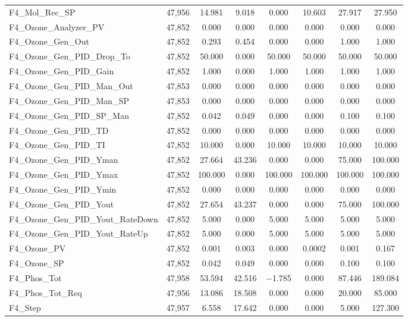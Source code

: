 \begin{table}[!htbp]
{\begin{tabular}{@{\extracolsep{5pt}}lccccccc}
F4\_Mol\_Rec\_SP & 47,956 & 14.981 & 9.018 & 0.000 & 10.603 & 27.917 & 27.950 \\ 
F4\_Ozone\_Analyzer\_PV & 47,852 & 0.000 & 0.000 & 0.000 & 0.000 & 0.000 & 0.000 \\ 
F4\_Ozone\_Gen\_Out & 47,852 & 0.293 & 0.454 & 0.000 & 0.000 & 1.000 & 1.000 \\ 
F4\_Ozone\_Gen\_PID\_Drop\_To & 47,852 & 50.000 & 0.000 & 50.000 & 50.000 & 50.000 & 50.000 \\ 
F4\_Ozone\_Gen\_PID\_Gain & 47,852 & 1.000 & 0.000 & 1.000 & 1.000 & 1.000 & 1.000 \\ 
F4\_Ozone\_Gen\_PID\_Man\_Out & 47,853 & 0.000 & 0.000 & 0.000 & 0.000 & 0.000 & 0.000 \\ 
F4\_Ozone\_Gen\_PID\_Man\_SP & 47,853 & 0.000 & 0.000 & 0.000 & 0.000 & 0.000 & 0.000 \\ 
F4\_Ozone\_Gen\_PID\_SP\_Man & 47,852 & 0.042 & 0.049 & 0.000 & 0.000 & 0.100 & 0.100 \\ 
F4\_Ozone\_Gen\_PID\_TD & 47,852 & 0.000 & 0.000 & 0.000 & 0.000 & 0.000 & 0.000 \\ 
F4\_Ozone\_Gen\_PID\_TI & 47,852 & 10.000 & 0.000 & 10.000 & 10.000 & 10.000 & 10.000 \\ 
F4\_Ozone\_Gen\_PID\_Yman & 47,852 & 27.664 & 43.236 & 0.000 & 0.000 & 75.000 & 100.000 \\ 
F4\_Ozone\_Gen\_PID\_Ymax & 47,852 & 100.000 & 0.000 & 100.000 & 100.000 & 100.000 & 100.000 \\ 
F4\_Ozone\_Gen\_PID\_Ymin & 47,852 & 0.000 & 0.000 & 0.000 & 0.000 & 0.000 & 0.000 \\ 
F4\_Ozone\_Gen\_PID\_Yout & 47,852 & 27.654 & 43.237 & 0.000 & 0.000 & 75.000 & 100.000 \\ 
F4\_Ozone\_Gen\_PID\_Yout\_RateDown & 47,852 & 5.000 & 0.000 & 5.000 & 5.000 & 5.000 & 5.000 \\ 
F4\_Ozone\_Gen\_PID\_Yout\_RateUp & 47,852 & 5.000 & 0.000 & 5.000 & 5.000 & 5.000 & 5.000 \\ 
F4\_Ozone\_PV & 47,852 & 0.001 & 0.003 & 0.000 & 0.0002 & 0.001 & 0.167 \\ 
F4\_Ozone\_SP & 47,852 & 0.042 & 0.049 & 0.000 & 0.000 & 0.100 & 0.100 \\ 
F4\_Phos\_Tot & 47,958 & 53.594 & 42.516 & $-$1.785 & 0.000 & 87.446 & 189.084 \\ 
F4\_Phos\_Tot\_Req & 47,956 & 13.086 & 18.508 & 0.000 & 0.000 & 20.000 & 85.000 \\ 
F4\_Step & 47,957 & 6.558 & 17.642 & 0.000 & 0.000 & 5.000 & 127.300 \\ 

\end{tabular}}
\end{table}

